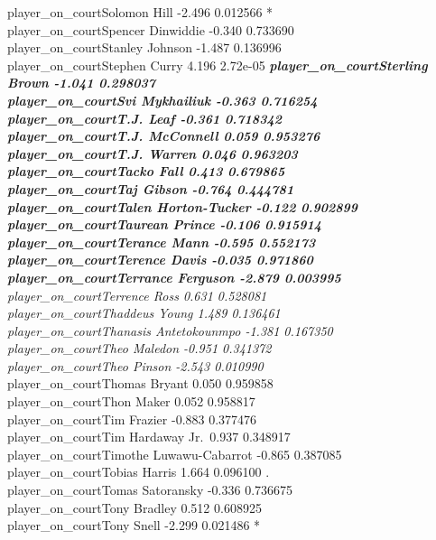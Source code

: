 \documentclass[
  landscape]{article}
\begin{document}
player\_on\_courtSolomon Hill -2.496 0.012566 *\\
player\_on\_courtSpencer Dinwiddie -0.340 0.733690\\
player\_on\_courtStanley Johnson -1.487 0.136996\\
player\_on\_courtStephen Curry 4.196 2.72e-05 \emph{\textbf{
player\_on\_courtSterling Brown -1.041 0.298037\\
player\_on\_courtSvi Mykhailiuk -0.363 0.716254\\
player\_on\_courtT.J. Leaf -0.361 0.718342\\
player\_on\_courtT.J. McConnell 0.059 0.953276\\
player\_on\_courtT.J. Warren 0.046 0.963203\\
player\_on\_courtTacko Fall 0.413 0.679865\\
player\_on\_courtTaj Gibson -0.764 0.444781\\
player\_on\_courtTalen Horton-Tucker -0.122 0.902899\\
player\_on\_courtTaurean Prince -0.106 0.915914\\
player\_on\_courtTerance Mann -0.595 0.552173\\
player\_on\_courtTerence Davis -0.035 0.971860\\
player\_on\_courtTerrance Ferguson -2.879 0.003995 }
player\_on\_courtTerrence Ross 0.631 0.528081\\
player\_on\_courtThaddeus Young 1.489 0.136461\\
player\_on\_courtThanasis Antetokounmpo -1.381 0.167350\\
player\_on\_courtTheo Maledon -0.951 0.341372\\
player\_on\_courtTheo Pinson -2.543 0.010990 }\\
player\_on\_courtThomas Bryant 0.050 0.959858\\
player\_on\_courtThon Maker 0.052 0.958817\\
player\_on\_courtTim Frazier -0.883 0.377476\\
player\_on\_courtTim Hardaway Jr.~0.937 0.348917\\
player\_on\_courtTimothe Luwawu-Cabarrot -0.865 0.387085\\
player\_on\_courtTobias Harris 1.664 0.096100 .\\
player\_on\_courtTomas Satoransky -0.336 0.736675\\
player\_on\_courtTony Bradley 0.512 0.608925\\
player\_on\_courtTony Snell -2.299 0.021486 *\\
\end{document}
